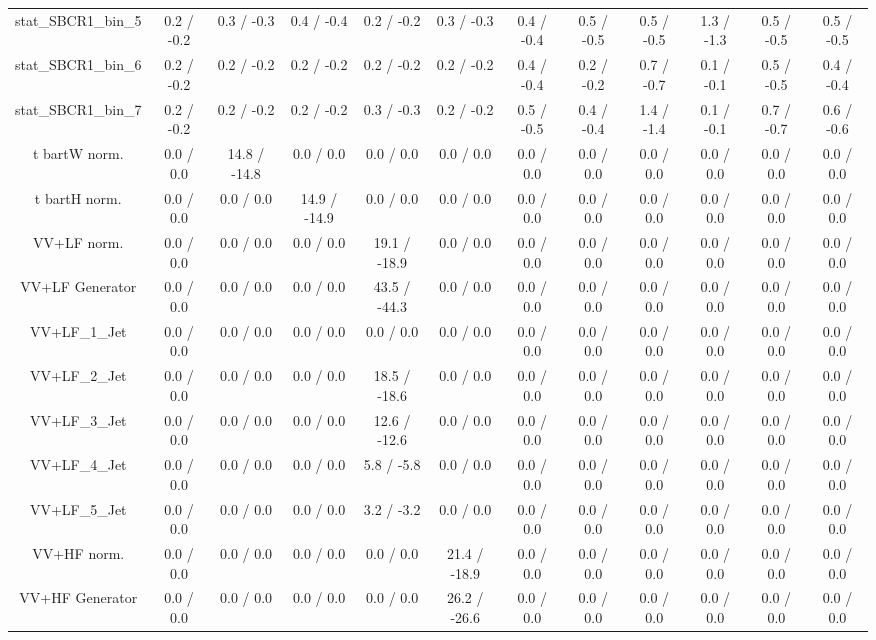 \begin{table}[htbp]
\begin{center}
\begin{tabular}{|c|c|c|c|c|c|c|c|c|c|c|c|}
 stat_SBCR1_bin_5 & 0.2 / -0.2 & 0.3 / -0.3 & 0.4 / -0.4 & 0.2 / -0.2 & 0.3 / -0.3 & 0.4 / -0.4 & 0.5 / -0.5 & 0.5 / -0.5 & 1.3 / -1.3 & 0.5 / -0.5 & 0.5 / -0.5 \\ 
 stat_SBCR1_bin_6 & 0.2 / -0.2 & 0.2 / -0.2 & 0.2 / -0.2 & 0.2 / -0.2 & 0.2 / -0.2 & 0.4 / -0.4 & 0.2 / -0.2 & 0.7 / -0.7 & 0.1 / -0.1 & 0.5 / -0.5 & 0.4 / -0.4 \\ 
 stat_SBCR1_bin_7 & 0.2 / -0.2 & 0.2 / -0.2 & 0.2 / -0.2 & 0.3 / -0.3 & 0.2 / -0.2 & 0.5 / -0.5 & 0.4 / -0.4 & 1.4 / -1.4 & 0.1 / -0.1 & 0.7 / -0.7 & 0.6 / -0.6 \\ 
  t bar{t}W norm. & 0.0 / 0.0 & 14.8 / -14.8 & 0.0 / 0.0 & 0.0 / 0.0 & 0.0 / 0.0 & 0.0 / 0.0 & 0.0 / 0.0 & 0.0 / 0.0 & 0.0 / 0.0 & 0.0 / 0.0 & 0.0 / 0.0 \\ 
  t bar{t}H norm. & 0.0 / 0.0 & 0.0 / 0.0 & 14.9 / -14.9 & 0.0 / 0.0 & 0.0 / 0.0 & 0.0 / 0.0 & 0.0 / 0.0 & 0.0 / 0.0 & 0.0 / 0.0 & 0.0 / 0.0 & 0.0 / 0.0 \\ 
  VV+LF norm. & 0.0 / 0.0 & 0.0 / 0.0 & 0.0 / 0.0 & 19.1 / -18.9 & 0.0 / 0.0 & 0.0 / 0.0 & 0.0 / 0.0 & 0.0 / 0.0 & 0.0 / 0.0 & 0.0 / 0.0 & 0.0 / 0.0 \\ 
  VV+LF Generator & 0.0 / 0.0 & 0.0 / 0.0 & 0.0 / 0.0 & 43.5 / -44.3 & 0.0 / 0.0 & 0.0 / 0.0 & 0.0 / 0.0 & 0.0 / 0.0 & 0.0 / 0.0 & 0.0 / 0.0 & 0.0 / 0.0 \\ 
  VV+LF_1_Jet & 0.0 / 0.0 & 0.0 / 0.0 & 0.0 / 0.0 & 0.0 / 0.0 & 0.0 / 0.0 & 0.0 / 0.0 & 0.0 / 0.0 & 0.0 / 0.0 & 0.0 / 0.0 & 0.0 / 0.0 & 0.0 / 0.0 \\ 
  VV+LF_2_Jet & 0.0 / 0.0 & 0.0 / 0.0 & 0.0 / 0.0 & 18.5 / -18.6 & 0.0 / 0.0 & 0.0 / 0.0 & 0.0 / 0.0 & 0.0 / 0.0 & 0.0 / 0.0 & 0.0 / 0.0 & 0.0 / 0.0 \\ 
  VV+LF_3_Jet & 0.0 / 0.0 & 0.0 / 0.0 & 0.0 / 0.0 & 12.6 / -12.6 & 0.0 / 0.0 & 0.0 / 0.0 & 0.0 / 0.0 & 0.0 / 0.0 & 0.0 / 0.0 & 0.0 / 0.0 & 0.0 / 0.0 \\ 
  VV+LF_4_Jet & 0.0 / 0.0 & 0.0 / 0.0 & 0.0 / 0.0 & 5.8 / -5.8 & 0.0 / 0.0 & 0.0 / 0.0 & 0.0 / 0.0 & 0.0 / 0.0 & 0.0 / 0.0 & 0.0 / 0.0 & 0.0 / 0.0 \\ 
  VV+LF_5_Jet & 0.0 / 0.0 & 0.0 / 0.0 & 0.0 / 0.0 & 3.2 / -3.2 & 0.0 / 0.0 & 0.0 / 0.0 & 0.0 / 0.0 & 0.0 / 0.0 & 0.0 / 0.0 & 0.0 / 0.0 & 0.0 / 0.0 \\ 
  VV+HF norm. & 0.0 / 0.0 & 0.0 / 0.0 & 0.0 / 0.0 & 0.0 / 0.0 & 21.4 / -18.9 & 0.0 / 0.0 & 0.0 / 0.0 & 0.0 / 0.0 & 0.0 / 0.0 & 0.0 / 0.0 & 0.0 / 0.0 \\ 
  VV+HF Generator & 0.0 / 0.0 & 0.0 / 0.0 & 0.0 / 0.0 & 0.0 / 0.0 & 26.2 / -26.6 & 0.0 / 0.0 & 0.0 / 0.0 & 0.0 / 0.0 & 0.0 / 0.0 & 0.0 / 0.0 & 0.0 / 0.0 \\ 

\end{tabular}
\end{center}
\end{table}
